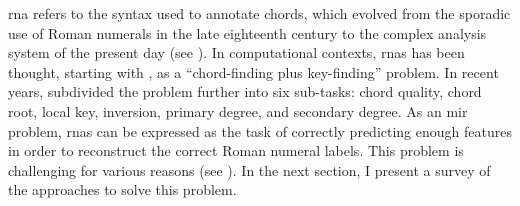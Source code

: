 

\gls{rna} refers to the syntax used to annotate chords,
which evolved from the sporadic use of Roman numerals in the
late eighteenth century to the complex analysis system of
the present day (see
). In
computational contexts, \glspl{rna} has been thought,
starting with \textcite{temperley1997algorithm}, as a
``chord-finding plus key-finding'' problem. In recent years,
\textcite{chen2018functional} subdivided the problem further
into six sub-tasks: chord quality, chord root, local key,
inversion, primary degree, and secondary degree. As an
\gls{mir} problem, \glspl{rna} can be expressed as the task
of correctly predicting enough features in order to
reconstruct the correct Roman numeral labels. This problem
is challenging for various reasons (see
). In the next section, I present a
survey of the approaches to solve this problem.
